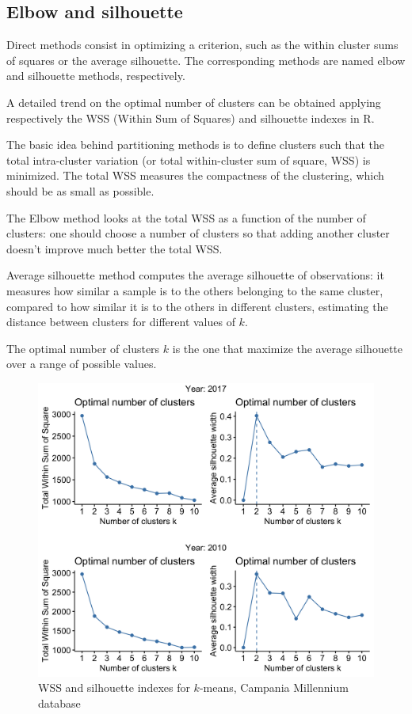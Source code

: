 \subsection{Elbow and silhouette}
Direct methods consist in optimizing a criterion, such as the within cluster sums of squares or the average silhouette. The corresponding methods are named elbow and silhouette methods, respectively.

A detailed trend on the optimal number of clusters can be obtained applying respectively the WSS (Within Sum of Squares) and silhouette indexes in R.

The basic idea behind partitioning methods is to define clusters such that the total intra-cluster variation (or total within-cluster sum of square, WSS) is minimized. The total WSS measures the compactness of the clustering, which should be as small as possible.

The Elbow method looks at the total WSS as a function of the number of clusters: one should choose a number of clusters so that adding another cluster doesn't improve much better the total WSS.

Average silhouette method computes the average silhouette of observations: it measures how similar a sample is to the others belonging to the same cluster, compared to how similar it is to the others in different clusters, estimating the distance between clusters for different values of $k$.

The optimal number of clusters $k$ is the one that maximize the average silhouette over a range of possible values\cite{silhouette}.

\begin{figure}[h]
	\centering
	\includegraphics[scale=0.22]{../k-means/optimal-clusters.png}
	\caption{\small WSS and silhouette indexes for $k$-means, Campania Millennium database}
\end{figure}

